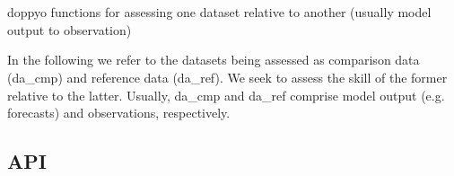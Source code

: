 \documentclass[letterpaper,10pt,english]{sphinxmanual}
\begin{document}
\section{}
\label{\detokenize{skill_doc:module-skill}}\label{\detokenize{skill_doc:skill}}\label{\detokenize{skill_doc::doc}}
doppyo functions for assessing one dataset relative to another (usually model output to observation)

In the following we refer to the datasets being assessed as comparison data (da\_cmp) and reference
data (da\_ref). We seek to assess the skill of the former relative to the latter. Usually, da\_cmp
and da\_ref comprise model output (e.g. forecasts) and observations, respectively.


\subsection{API}
\label{\detokenize{skill_doc:api}}
\end{document}
